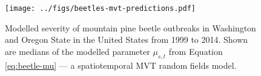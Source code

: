 \documentclass[12pt,english]{article}
\begin{document}
\begin{spacing}{1.9}
\clearpage

\begin{figure}[htb]
  \begin{center}
    \texttt{[image: ../figs/beetles-mvt-predictions.pdf]}
    \caption{Modelled severity of mountain pine beetle outbreaks in Washington and
      Oregon State in the United States from 1999 to 2014.
      Shown are medians of the modelled parameter $\mu_{s,t}$ from Equation \ref{eq:beetle-mu}
      --- a spatiotemporal MVT random fields model.
    }
    \label{fig:beetle-pred}
  \end{center}
\end{figure}


\end{spacing}
\end{document}
